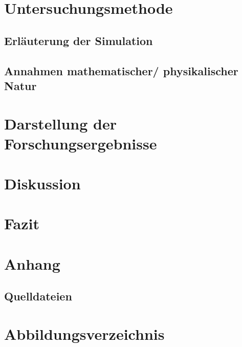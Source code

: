 \documentclass[11pt,a4paper]{article}
\theoremstyle{definition}
\numberwithin{equation}{section} %
\begin{document}
\section{Untersuchungsmethode}

\subsection{Erläuterung der Simulation}

\label{sec:sim}

\subsection{Annahmen mathematischer/ physikalischer Natur}

\section{Darstellung der Forschungsergebnisse}

\section{Diskussion}

\section{Fazit}

\section{Anhang}

\subsection{Quelldateien}

\section{Abbildungsverzeichnis}




\end{document}
